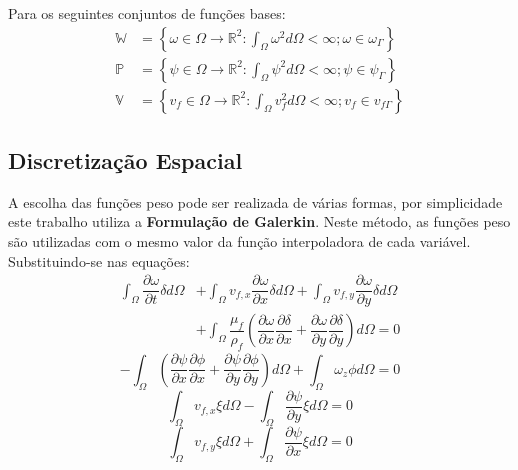 Para os seguintes conjuntos de funções bases:
\begin{align}
    \mathbb{W}&=\left\{\omega \in \Omega \rightarrow \mathbb{R}^2: 
    \int_{\Omega} \omega^2 d\Omega < \infty; \omega \in \omega_{\Gamma}\right\} \\
    \mathbb{P}&=\left\{\psi \in \Omega \rightarrow \mathbb{R}^2: 
    \int_{\Omega} \psi^2 d\Omega < \infty; \psi \in \psi_{\Gamma}\right\} \\
    \mathbb{V}&=\left\{v_f \in \Omega \rightarrow \mathbb{R}^2: 
    \int_{\Omega} v_f^2 d\Omega < \infty; v_f \in v_{f\Gamma}\right\}
\end{align}


\subsection{\textbf{Discretização Espacial}}
A escolha das funções peso pode ser realizada de várias formas, por simplicidade este trabalho utiliza a \textbf{Formulação de Galerkin}.
Neste método, as funções peso são utilizadas com o mesmo valor da função interpoladora de cada variável. 
Substituindo-se nas equações:
\begin{align}
    \int_{\Omega}
    \dfrac{\partial \omega}{\partial t}
    \delta d\Omega &+
    \int_{\Omega}
    v_{f,x}\dfrac{\partial \omega}{\partial x}
    \delta d\Omega +
    \int_{\Omega}
    v_{f,y}\dfrac{\partial \omega}{\partial y}
    \delta d\Omega \nonumber\\&+
    \int_{\Omega}
    \dfrac{\mu_f}{\rho_f}
    \left(
    \dfrac{\partial \omega}{\partial x}
    \dfrac{\partial \delta}{\partial x} +
    \dfrac{\partial \omega}{\partial y}
    \dfrac{\partial \delta}{\partial y}
    \right) d\Omega= 0
\end{align}
\begin{equation}
    -\int_{\Omega}
    \left(
    \dfrac{\partial \psi}{\partial x}
    \dfrac{\partial \phi}{\partial x} +
    \dfrac{\partial \psi}{\partial y}
    \dfrac{\partial \phi}{\partial y}
    \right) d\Omega +
    \int_{\Omega}
    \omega_z
    \phi d\Omega = 0
\end{equation}
\begin{equation}
    \int_{\Omega}
    v_{f,x}
    \xi d\Omega -
    \int_{\Omega}
    \dfrac{\partial \psi}{\partial y}
    \xi d\Omega = 0
\end{equation}
\begin{equation}
    \int_{\Omega}
    v_{f,y}
    \xi d\Omega +
    \int_{\Omega}
    \dfrac{\partial \psi}{\partial x}
    \xi d\Omega = 0
\end{equation}

